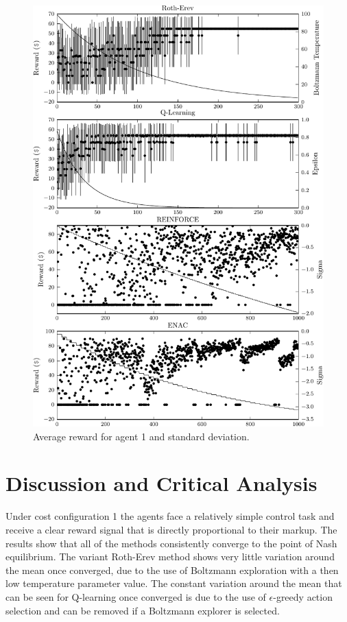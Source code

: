 {\begin{figure}
	  \includegraphics{figures/fig5_2_reward_a1}
	  \caption{Average reward for agent 1 and standard deviation.}
	  \label{fig:5_2_reward_a1}
	\end{figure}
}{}

\section{Discussion and Critical Analysis}
Under cost configuration 1 the agents face a relatively simple control task and
receive a clear reward signal that is directly proportional to their markup. The
results show that all of the methods consistently converge to the point of Nash
equilibrium.  The variant Roth-Erev method shows very little variation around
the mean once converged, due to the use of Boltzmann exploration with a then low
temperature parameter value.  The constant variation around the mean that can be
seen for Q-learning once converged is due to the use of $\epsilon$-greedy action
selection and can be removed if a Boltzmann explorer is selected.

